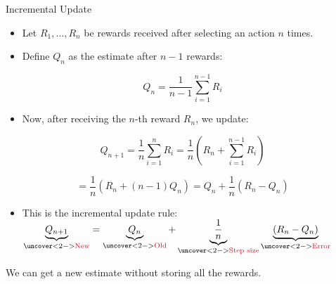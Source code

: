 \documentclass[11pt,table]{beamer}
\begin{document}
\begin{frame}{Incremental Update}
\renewcommand{\baselinestretch}{0.8}
\begin{itemize}
  \item Let $R_1, \dots, R_n$ be rewards received after selecting an action $n$ times.
  \item Define $Q_n$ as the estimate after $n-1$ rewards:
\end{itemize}

\[
Q_n = \frac{1}{n-1} \sum_{i=1}^{n-1} R_i
\]

\begin{itemize}
  \item Now, after receiving the $n$-th reward $R_n$, we update:
\end{itemize}

\[
Q_{n+1} = \frac{1}{n} \sum_{i=1}^{n} R_i = \frac{1}{n} \left( R_n + \sum_{i=1}^{n-1} R_i \right)
\]

\[
= \frac{1}{n} \left( R_n + (n-1) Q_n \right) = Q_n + \frac{1}{n} \left( R_n - Q_n \right)
\]

\pause
\begin{itemize}
  \item This is the incremental update rule:\\
$\underbrace{Q_{n+1}}_{\uncover<2->{\text{\textcolor{red1}{New}}}} = 
\underbrace{Q_n}_{\uncover<2->{\text{\textcolor{red1}{Old}}}} + 
\underbrace{\frac{1}{n}}_{\uncover<2->{\text{\textcolor{red1}{Step size}}}} 
\underbrace{(R_n - Q_n)}_{\uncover<2->{\text{\textcolor{red1}{Error}}}}
$
\end{itemize}
\pause We can get a new estimate without storing all the rewards.

\end{frame}
\end{document}
